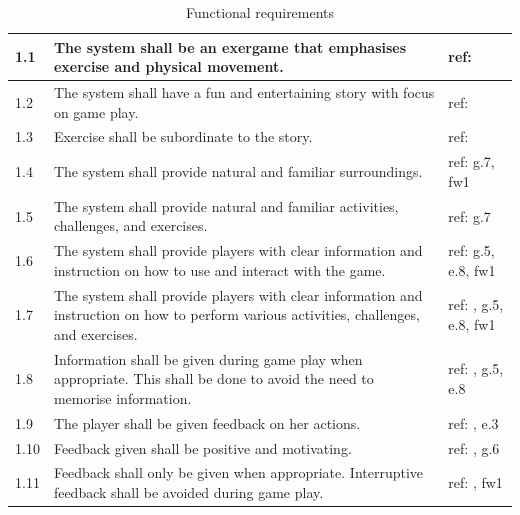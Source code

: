 \begin{table} [H]
\centering
\begin{tabular}{|>{\raggedright}p{}|p{}|p{2cm}|}
\hline
1.1 & The system shall be an exergame that emphasises exercise and physical movement. & ref: \cite{project} \\ \hline
1.2 & The system shall have a fun and entertaining story with focus on game play.  & ref: \cite{project} \cite{zyda2005visual} \\ \hline
1.3 & Exercise shall be subordinate to the story.  & ref:\cite{zyda2005visual} \\ \hline
1.4 & The system shall provide natural and familiar surroundings.  & ref: g.7, fw1\\ \hline
1.5 & The system shall provide natural and familiar activities, challenges, and exercises. & ref: g.7 \\ \hline
1.6 & The system shall provide players with clear information and instruction on how to use and interact with the game. & ref: g.5, e.8, fw1 \\ \hline
1.7 & The system shall provide players with clear information and instruction on how to perform various activities, challenges, and exercises. & ref: \cite{sweetser}, g.5, e.8, fw1\\ \hline
1.8 & Information shall be given during game play when appropriate. This shall be done to avoid the need to memorise information. & ref: \cite{sweetser}, g.5, e.8 \\ \hline
1.9 & The player shall be given feedback on her actions. & ref: \cite{sweetser}, e.3 \\ \hline
1.10 & Feedback given shall be positive and motivating. & ref: \cite{sweetser}, g.6 \\ \hline
1.11 & Feedback shall only be given when appropriate. Interruptive feedback shall be avoided during game play. &  ref: \cite{sweetser}, fw1 \\ \hline
    \end{tabular}
    \caption[Functional requirements, part 1]{Functional requirements}
    \label{tab:func1}
\end{table} 

